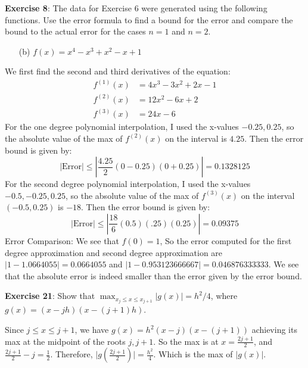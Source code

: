 \documentclass{article}
\begin{document}
\textbf{Exercise 8}: The data for Exercise $6$ were generated using the following functions. Use the error formula to find a bound for the error and compare the bound to the actual error for the cases $n = 1$ and $n = 2$.
    \begin{itemize}
        \item [(b)] $f(x) = x^{4} - x^{3} + x^{2} - x + 1$ 
    \end{itemize}
    \begin{answer}
        We first find the second and third derivatives of the equation:
            \begin{align*}
                f^{(1)}(x) &= 4x^{3} - 3x^{2} + 2x - 1 \\
                f^{(2)}(x) &= 12x^{2} - 6x + 2         \\
                f^{(3)}(x) &= 24x - 6
            \end{align*}
        For the one degree polynomial interpolation, I used the x-values $-0.25, 0.25$, so the absolute value of the max of $f^{(2)}(x)$ on the interval is $4.25$. Then the error bound is given by:
            \begin{equation*}
                \lvert \text{Error} \rvert \leq \left\lvert \dfrac{4.25}{2}(0 - 0.25)(0 + 0.25) \right\rvert = 0.1328125
            \end{equation*}
        For the second degree polynomial interpolation, I used the x-values $-0.5, -0.25, 0.25$, so the absolute value of the max of $f^{(3)}(x)$ on the interval $(-0.5, 0.25)$ is $-18$. Then the error bound is given by:
            \begin{equation*}
                \lvert \text{Error} \rvert \leq \left\lvert \dfrac{18}{6}(0.5)(.25)(0.25) \right\rvert = 0.09375
            \end{equation*}
        Error Comparison: We see that $f(0) = 1$, So the error computed for the first degree approximation and second degree approximation are $\lvert 1 - 1.0664055 \rvert = 0.0664055$ and $\lvert 1 - 0.953123666667 \rvert = 0.046876333333$. We see that the absolute error is indeed smaller than the error given by the error bound.
    \end{answer}

\textbf{Exercise 21}: Show that $\max_{x_{j} \leq x \leq x_{j + 1}}\lvert g(x) \rvert = h^{2} / 4$, where $g(x) = (x - jh)(x - (j + 1)h)$.
    \begin{answer}
        Since $j \leq x \leq j + 1$, we have $g(x) = h^{2}(x - j)(x - (j + 1))$ achieving its max at the midpoint of the roots $j, j + 1$. So the max is at $x = \frac{2j + 1}{2}$, and $\frac{2j + 1}{2} - j = \frac{1}{2}$. Therefore, $\lvert g(\frac{2j + 1}{2}) \rvert = \frac{h^{2}}{4}$. Which is the max of $\lvert g(x) \rvert$.
    \end{answer}
\end{document}
